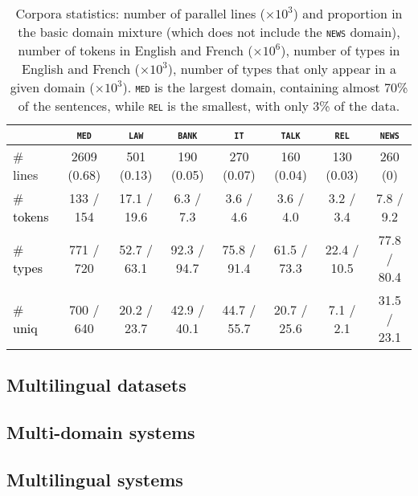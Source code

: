 \documentclass[11pt]{article}
\newcommand{\revisiondone}[1]{\textcolor{black}{#1}}
\newcommand{\domain}[1]{\texttt{\textsc{#1}}}
\begin{document}
\begin{table*}[h!]
  \centering
  \begin{tabular}{|l|ccccccc|} %
    \cline{2-8} 
    \multicolumn{1}{c|}{} & \multicolumn{1}{c}{\domain{med}} & \multicolumn{1}{c}{\domain{law}} & \multicolumn{1}{c}{\domain{bank}} & \multicolumn{1}{c}{\domain{it}} & \multicolumn{1}{c}{\domain{talk}} & \multicolumn{1}{c}{\domain{rel}} & \multicolumn{1}{c|}{\domain{news}} \\
    \hline 
    \# lines & 2609 (0.68) & 501 (0.13) & 190 (0.05) & 270 (0.07) & 160 (0.04) & 130 (0.03) & 260 (0) \\
    \# \revisiondone{tokens}  &  133 / 154  &  17.1 / 19.6 &  6.3 / 7.3 &  3.6 / 4.6 &  3.6 / 4.0 &  3.2 / 3.4 & 7.8 / 9.2   \\
    \# \revisiondone{types}  & 771 / 720 & 52.7 / 63.1 & 92.3 / 94.7 & 75.8 / 91.4 & 61.5 / 73.3 & 22.4 / 10.5 & 77.8 / 80.4 \\
    \# \revisiondone{uniq} & 700 / 640 & 20.2 / 23.7 & 42.9 / 40.1 & 44.7 / 55.7 & 20.7 / 25.6 & 7.1 / 2.1 & 31.5 / 23.1 \\
    \hline
  \end{tabular}
  \caption{Corpora statistics: number of parallel lines ($\times 10^3$) and proportion in the basic domain mixture (which does not include the \domain{news} domain), number of tokens in English and French ($\times 10^6$), number of types in English and French ($\times 10^3$), number of types that only appear in a given domain ($\times 10^3$). \domain{med} is the largest domain, containing almost 70\% of the sentences, while \domain{rel} is the smallest, with only 3\% of the data.
  }
\label{tab:Corpora-chap4}
\end{table*}

\subsection{Multilingual datasets}

\subsection{Multi-domain systems}

\subsection{Multilingual systems}
\end{document}
